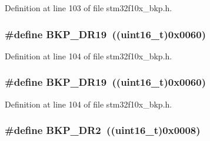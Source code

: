 Definition at line 103 of file stm32f10x\+\_\+bkp.\+h.

\subsubsection[{\texorpdfstring{B\+K\+P\+\_\+\+D\+R19}{BKP_DR19}}]{\setlength{\rightskip}{0pt plus 5cm}\#define B\+K\+P\+\_\+\+D\+R19~(({\bf uint16\+\_\+t})0x0060)}\hypertarget{group___data___backup___register_ga67587a68a981d5d8e0b1302d21db1f9b}{}\label{group___data___backup___register_ga67587a68a981d5d8e0b1302d21db1f9b}


Definition at line 104 of file stm32f10x\+\_\+bkp.\+h.

\subsubsection[{\texorpdfstring{B\+K\+P\+\_\+\+D\+R19}{BKP_DR19}}]{\setlength{\rightskip}{0pt plus 5cm}\#define B\+K\+P\+\_\+\+D\+R19~(({\bf uint16\+\_\+t})0x0060)}\hypertarget{group___data___backup___register_ga67587a68a981d5d8e0b1302d21db1f9b}{}\label{group___data___backup___register_ga67587a68a981d5d8e0b1302d21db1f9b}


Definition at line 104 of file stm32f10x\+\_\+bkp.\+h.

\subsubsection[{\texorpdfstring{B\+K\+P\+\_\+\+D\+R2}{BKP_DR2}}]{\setlength{\rightskip}{0pt plus 5cm}\#define B\+K\+P\+\_\+\+D\+R2~(({\bf uint16\+\_\+t})0x0008)}\hypertarget{group___data___backup___register_ga73867f10a3ef17eeb0d3ace641f185ad}{}\label{group___data___backup___register_ga73867f10a3ef17eeb0d3ace641f185ad}


